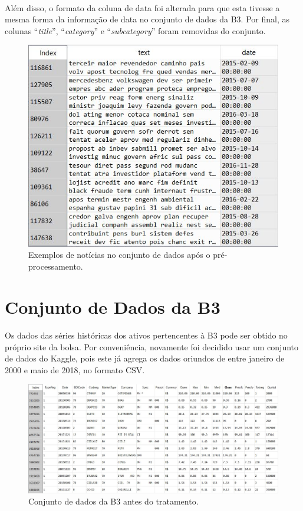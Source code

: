 \documentclass[grad,numbers]{coppe}
\begin{document}
  			\paragraph{}Além disso, o formato da coluna de data foi alterada para que esta tivesse a mesma forma da informação de data no conjunto de dados da B3. Por final, as colunas ``\textit{title}'', ``\textit{category}'' e ``\textit{subcategory}'' foram removidas do conjunto.
	  		\begin{figure}[h]
	  			\centering
					{\includegraphics[width=13cm]{folha-pp-dataset}
  				\caption{Exemplos de notícias no conjunto de dados após o pré-processamento.}
  				\label{fig:folha-pp-dataset-fig}}
  			\end{figure}
  			
  	\section{Conjunto de Dados da B3}
  		\paragraph{}Os dados das séries históricas dos ativos pertencentes à B3 pode ser obtido no próprio site da bolsa\cite{b3-serie-historica}. Por conveniência, novamente foi decidido usar um conjunto de dados do Kaggle\cite{b3-dataset}, pois este já agrega os dados oriundos de \cite{b3-serie-historica} entre janeiro de 2000 e maio de 2018, no formato CSV.
			\begin{figure}[h]
				\centering
				{\includegraphics[width=13cm]{b3-dataset}
					\caption{Conjunto de dados da B3 antes do tratamento.}
					\label{fig:b3-dataset-fig}}
			\end{figure}
\end{document}
